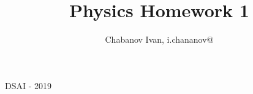 

\begin{titlepage}
    \title{Physics Homework 1}
    \author{Chabanov Ivan, i.chananov@}
    \maketitle
    DSAI - 2019


\end{titlepage}